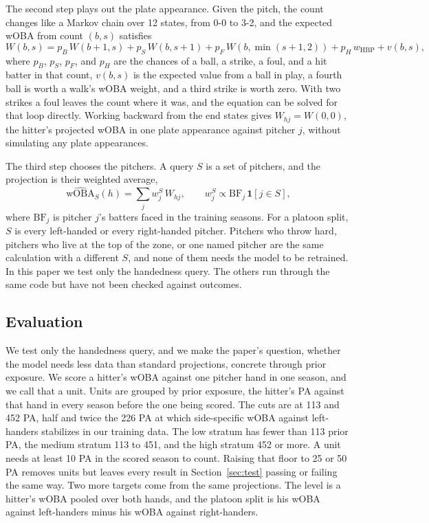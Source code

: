 \documentclass[11pt,letterpaper]{article}
\begin{document}
The second step plays out the plate appearance. Given the pitch, the count changes like a Markov chain over 12 states, from 0-0 to 3-2, and the expected wOBA from count $(b,s)$ satisfies
\begin{equation}
W(b,s) = p_B\, W(b+1,s) + p_S\, W(b,s+1) + p_F\, W(b,\min(s+1,2)) + p_H\, w_{\text{HBP}} + v(b,s),
\label{eq:chain}
\end{equation}
where $p_B$, $p_S$, $p_F$, and $p_H$ are the chances of a ball, a strike, a foul, and a hit batter in that count, $v(b,s)$ is the expected value from a ball in play, a fourth ball is worth a walk's wOBA weight, and a third strike is worth zero. With two strikes a foul leaves the count where it was, and the equation can be solved for that loop directly. Working backward from the end states gives $W_{hj} = W(0,0)$, the hitter's projected wOBA in one plate appearance against pitcher $j$, without simulating any plate appearances.

The third step chooses the pitchers. A query $S$ is a set of pitchers, and the projection is their weighted average,
\begin{equation}
\widehat{\text{wOBA}}_S(h) = \sum_{j} w^S_j \, W_{hj}, \qquad w^S_j \propto \text{BF}_j \, \mathbf{1}[j \in S],
\label{eq:query}
\end{equation}
where $\text{BF}_j$ is pitcher $j$'s batters faced in the training seasons. For a platoon split, $S$ is every left-handed or every right-handed pitcher. Pitchers who throw hard, pitchers who live at the top of the zone, or one named pitcher are the same calculation with a different $S$, and none of them needs the model to be retrained. In this paper we test only the handedness query. The others run through the same code but have not been checked against outcomes.


\subsection{Evaluation}
\label{sec:eval}

We test only the handedness query, and we make the paper's question, whether the model needs less data than standard projections, concrete through prior exposure. We score a hitter's wOBA against one pitcher hand in one season, and we call that a unit. Units are grouped by prior exposure, the hitter's PA against that hand in every season before the one being scored. The cuts are at 113 and 452 PA, half and twice the 226 PA at which side-specific wOBA against left-handers stabilizes in our training data. The low stratum has fewer than 113 prior PA, the medium stratum 113 to 451, and the high stratum 452 or more. A unit needs at least 10 PA in the scored season to count. Raising that floor to 25 or 50 PA removes units but leaves every result in Section~\ref{sec:test} passing or failing the same way. Two more targets come from the same projections. The level is a hitter's wOBA pooled over both hands, and the platoon split is his wOBA against left-handers minus his wOBA against right-handers.
\end{document}
